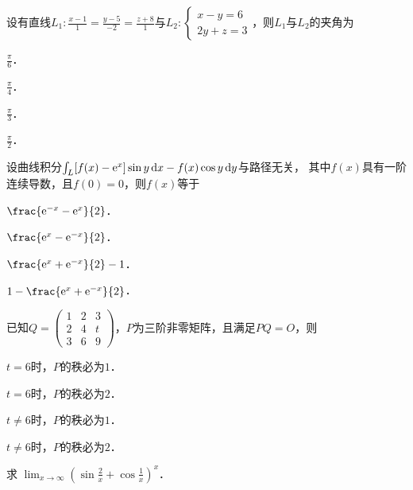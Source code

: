 \documentclass[plain,noanswer,medmath]{../../template/jnuexam}
\begin{document}
\begin{problem}
设有直线$L_1:\frac{x - 1}{1} = \frac{y - 5}{-2} = \frac{z + 8}{1}$与$L_2:\begin{cases}
  x - y = 6 \\
  2y + z = 3
\end{cases}$，则$L_1$与$L_2$的夹角为\pickout{}
\begin{abcd}
\item $\frac{\pi}{6}$．        
\item $\frac{\pi}{4}$．        
\item $\frac{\pi}{3}$．        
\item $\frac{\pi}{2}$．
\end{abcd}
\end{problem}


\begin{problem}
设曲线积分$\int_L [f(x) - \mathrm{e}^x]\sin y\mathop{}\!\mathrm{d} x - f(x)\cos y\mathop{}\!\mathrm{d} y$与路径无关，
其中$f(x)$具有一阶连续导数，且$f(0) = 0$，则$f(x)$等于\pickout{}
\begin{abcd}
\item $\frac{\e^{- x} - \e^x}{2}$．   
\item $\frac{\e^x - \e^{-x}}{2}$．   
\item $\frac{\e^x + \e^{-x}}{2} - 1$．   
\item $1-\frac{\e^x + \e^{-x}}{2}$．
\end{abcd}
\end{problem}


\begin{problem}
已知$Q = \begin{pmatrix}
  1 & 2 & 3 \\
  2 & 4 & t \\
  3 & 6 & 9
\end{pmatrix}$，$P$为三阶非零矩阵，且满足$PQ = O$，则
\begin{abcd}
\item $t = 6$时，$P$的秩必为$1$．
\item $t = 6$时，$P$的秩必为$2$．
\item $t \ne 6$时，$P$的秩必为$1$．
\item $t \ne 6$时，$P$的秩必为$2$．
\end{abcd}
\end{problem}




\begin{problem}
求 $\lim_{x \to \infty} \left(\sin \frac{2}{x} + \cos \frac{1}{x} \right)^x$．
\end{problem}
\end{document}
